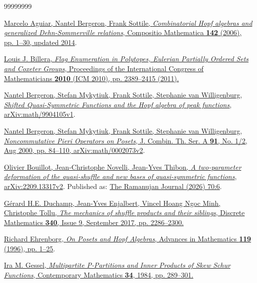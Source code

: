 \documentclass[numbers=enddot,12pt,final,onecolumn,notitlepage]{scrartcl}%
\theoremstyle{definition}
\begin{document}
\begin{thebibliography}{99999999}                                                                                         %


%
\href{http://pi.math.cornell.edu/~maguiar/CHalgebra.pdf}{Marcelo Aguiar,
Nantel Bergeron, Frank Sottile, \textit{Combinatorial Hopf algebras and
generalized Dehn-Sommerville relations}, Compositio Mathematica \textbf{142}
(2006), pp. 1--30, updated 2014}.

%
\href{https://pi.math.cornell.edu/~billera/papers/eulericm.pdf}{Louis J.
Billera, \textit{Flag Enumeration in Polytopes, Eulerian Partially Ordered
Sets and Coxeter Groups}, Proceedings of the International Congress of
Mathematicians \textbf{2010} (ICM 2010), pp. 2389--2415 (2011).}

\href{https://arxiv.org/abs/math/9904105v1}{Nantel
Bergeron, Stefan Mykytiuk, Frank Sottile, Stephanie van Willigenburg,
\textit{Shifted Quasi-Symmetric Functions and the Hopf algebra of peak
functions}, arXiv:math/9904105v1}.

\href{https://arxiv.org/abs/math/0002073v2}{Nantel
Bergeron, Stefan Mykytiuk, Frank Sottile, Stephanie van Willigenburg,
\textit{Noncommutative Pieri Operators on Posets}, J. Combin. Th. Ser. A
\textbf{91}, No. 1/2, Aug 2000, pp. 84--110, arXiv:math/0002073v2}.

\href{https://arxiv.org/abs/2209.13317v2}{Olivier
Bouillot, Jean-Christophe Novelli, Jean-Yves Thibon, \textit{A two-parameter
deformation of the quasi-shuffle and new bases of quasi-symmetric functions},
arXiv:2209.13317v2}. Published as:
\href{https://doi.org/10.1007/s11139-026-01388-4}{The Ramanujan Journal (2026)
70:6}.

%
\href{https://doi.org/10.1016/j.disc.2017.03.004}{G\'{e}rard H.E. Duchamp,
Jean-Yves Enjalbert, Vincel Hoang Ngoc Minh, Christophe Tollu, \textit{The
mechanics of shuffle products and their siblings}, Discrete Mathematics
\textbf{340}, Issue 9, September 2017, pp. 2286--2300.}

%
\href{https://www.ms.uky.edu/~jrge/papers/hopf.pdf}{Richard Ehrenborg,
\textit{On Posets and Hopf Algebras}, Advances in Mathematics \textbf{119}
(1996), pp. 1--25}.

%
\href{https://people.brandeis.edu/~gessel/homepage/papers/multipartite.pdf}{Ira
M. Gessel, \textit{Multipartite P-Partitions and Inner Products of Skew Schur
Functions}, Contemporary Mathematics \textbf{34}, 1984, pp. 289--301.}


\end{thebibliography}
\end{document}
